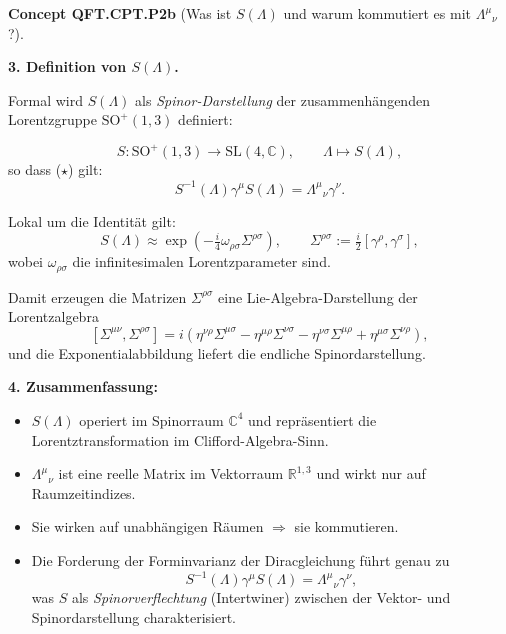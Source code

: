 \documentclass[10pt, letterpaper]{article}
\newcommand{\R}{\mathbb{R}}
\newcommand{\C}{\mathbb{C}}
\newcommand{\SL}{\mathrm{SL}}
\newcommand{\SO}{\mathrm{SO}}
\newcommand{\CustomHeading}[3]{%
  \par\medskip\noindent%
  \textbf{#1 #2} \textnormal{(#3)}.\enskip%
}
\newenvironment{CONC}[2]{\begin{unitbox}\CustomHeading{Concept}{#1}{#2}}{\end{unitbox}}
\begin{document}
\begin{CONC}{QFT.CPT.P2b}{Was ist $S(\Lambda)$ und warum kommutiert es mit $\Lambda^\mu{}_\nu$?}
\textbf{3. Definition von $S(\Lambda)$.}

Formal wird $S(\Lambda)$ als \emph{Spinor-Darstellung} der zusammenhängenden Lorentzgruppe $\SO^+(1,3)$ definiert:

\[
S: \SO^+(1,3) \to \SL(4,\C),\qquad
\Lambda \mapsto S(\Lambda),
\]
so dass ($\star$) gilt:
\[
S^{-1}(\Lambda)\gamma^\mu S(\Lambda)=\Lambda^\mu{}_\nu\gamma^\nu.
\]

Lokal um die Identität gilt:
\[
S(\Lambda)\approx \exp\!\left(-\tfrac{i}{4}\omega_{\rho\sigma}\Sigma^{\rho\sigma}\right),
\qquad
\Sigma^{\rho\sigma}:=\tfrac{i}{2}[\gamma^\rho,\gamma^\sigma],
\]
wobei $\omega_{\rho\sigma}$ die infinitesimalen Lorentzparameter sind.

Damit erzeugen die Matrizen $\Sigma^{\rho\sigma}$ eine Lie-Algebra-Darstellung der Lorentzalgebra
\[
[\Sigma^{\mu\nu},\Sigma^{\rho\sigma}]
= i(\eta^{\nu\rho}\Sigma^{\mu\sigma}-\eta^{\mu\rho}\Sigma^{\nu\sigma}
-\eta^{\nu\sigma}\Sigma^{\mu\rho}+\eta^{\mu\sigma}\Sigma^{\nu\rho}),
\]
und die Exponentialabbildung liefert die endliche Spinordarstellung.

\textbf{4. Zusammenfassung:}
\begin{itemize}
  \item $S(\Lambda)$ operiert im Spinorraum $\C^4$ und repräsentiert die Lorentztransformation im Clifford-Algebra-Sinn.
  \item $\Lambda^\mu{}_\nu$ ist eine reelle Matrix im Vektorraum $\R^{1,3}$ und wirkt nur auf Raumzeitindizes.
  \item Sie wirken auf unabhängigen Räumen $\Rightarrow$ sie kommutieren.
  \item Die Forderung der Forminvarianz der Diracgleichung führt genau zu
  \[
  S^{-1}(\Lambda)\gamma^\mu S(\Lambda)=\Lambda^\mu{}_\nu\gamma^\nu,
  \]
  was $S$ als \emph{Spinorverflechtung} (Intertwiner) zwischen der Vektor- und Spinordarstellung charakterisiert.
\end{itemize}
\end{CONC}
\end{document}
